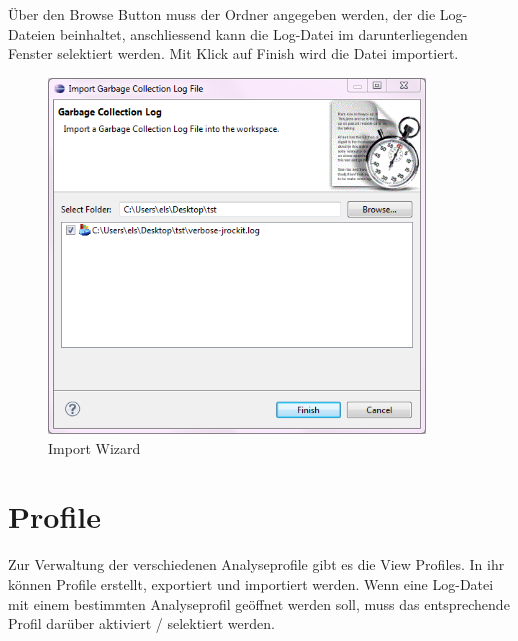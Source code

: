 Über den Browse Button muss der Ordner angegeben werden, der die Log-Dateien beinhaltet, anschliessend kann die Log-Datei im darunterliegenden Fenster selektiert werden. Mit Klick auf Finish wird die Datei importiert.
 \begin{figure}[H]
  	\centering
    	\includegraphics[width=10cm]{images/tutorial_importlog}
        	\caption{Import Wizard}
\end{figure}

\section{Profile}
Zur Verwaltung der verschiedenen Analyseprofile gibt es die View Profiles. In ihr können Profile erstellt, exportiert und importiert werden. Wenn eine Log-Datei mit einem bestimmten Analyseprofil geöffnet werden soll, muss das entsprechende Profil darüber aktiviert / selektiert werden.

